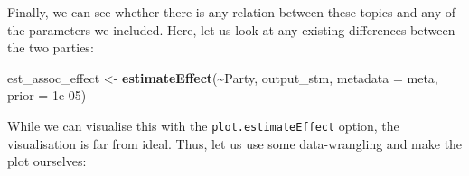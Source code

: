 \documentclass[
]{book}
\newenvironment{Shaded}{\begin{snugshade}}{\end{snugshade}}
\newcommand{\AttributeTok}[1]{\textcolor[rgb]{0.13,0.29,0.53}{#1}}
\newcommand{\FloatTok}[1]{\textcolor[rgb]{0.00,0.00,0.81}{#1}}
\newcommand{\FunctionTok}[1]{\textcolor[rgb]{0.13,0.29,0.53}{\textbf{#1}}}
\newcommand{\NormalTok}[1]{#1}
\newcommand{\OtherTok}[1]{\textcolor[rgb]{0.56,0.35,0.01}{#1}}
\newcommand{\SpecialCharTok}[1]{\textcolor[rgb]{0.81,0.36,0.00}{\textbf{#1}}}
\begin{document}
Finally, we can see whether there is any relation between these topics and any of the parameters we included. Here, let us look at any existing differences between the two parties:

\begin{Shaded}
\begin{Highlighting}[]
\NormalTok{est\_assoc\_effect }\OtherTok{\textless{}{-}} \FunctionTok{estimateEffect}\NormalTok{(}\SpecialCharTok{\textasciitilde{}}\NormalTok{Party, output\_stm, }\AttributeTok{metadata =}\NormalTok{ meta, }\AttributeTok{prior =} \FloatTok{1e{-}05}\NormalTok{)}
\end{Highlighting}
\end{Shaded}

While we can visualise this with the \texttt{plot.estimateEffect} option, the visualisation is far from ideal. Thus, let us use some data-wrangling and make the plot ourselves:
\end{document}
